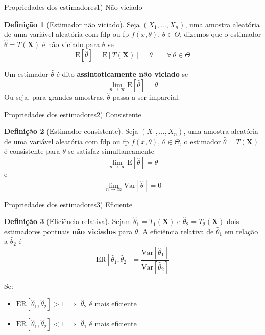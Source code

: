 \documentclass[10pt]{beamer}\usepackage[]{graphicx}\usepackage[]{color}
\newcommand{\mb}[1]{\mathbf{#1}}
\providecommand{\E}{\text{E}}
\providecommand{\Var}{\text{Var}}
\theoremstyle{definition}
\newtheorem*{mydef}{Definição}
\begin{document}
\begin{frame}[fragile]{Propriedades dos estimadores}{1) Não viciado}
  \begin{mydef}[Estimador não viciado]
    Seja $(X_1, \ldots, X_n)$, uma amostra aleatória de uma variável
    aleatória com fdp ou fp $f(x,\theta)$, $\theta \in \Theta$, dizemos
    que o estimador $\hat{\theta} = T(\mb{X})$ é não viciado para
    $\theta$ se
    \begin{equation*}
      \E[\hat{\theta}] = \E[T(\mb{X})] = \theta \qquad \forall \, \theta
      \in \Theta
    \end{equation*}
  \end{mydef}
  Um estimador $\hat\theta$ é dito \textbf{assintoticamente não viciado}
  se
  \begin{equation*}
    \lim_{n \to \infty} \E[\hat{\theta}] = \theta
  \end{equation*}
  Ou seja, para grandes amostras, $\hat\theta$ passa a ser imparcial.
\end{frame}

\begin{frame}[fragile]{Propriedades dos estimadores}{2) Consistente}
  \begin{mydef}[Estimador consistente]
    Seja $(X_1, \ldots, X_n)$, uma amostra aleatória de uma variável
    aleatória com fdp ou fp $f(x,\theta)$, $\theta \in \Theta$, o
    estimador $\hat{\theta} = T(\mb{X})$ é consistente para $\theta$ se
    satisfaz simultaneamente
    \begin{equation*}
      \lim_{n \to \infty} \E[\hat{\theta}] = \theta
    \end{equation*}
    e
    \begin{equation*}
      \lim_{n \to \infty} \Var[\hat{\theta}] = 0
    \end{equation*}
  \end{mydef}
\end{frame}

\begin{frame}[fragile]{Propriedades dos estimadores}{3) Eficiente}
  \begin{mydef}[Eficiência relativa]
    Sejam $\hat{\theta}_1 = T_1(\mb{X})$ e $\hat{\theta}_2 =
    T_2(\mb{X})$ dois estimadores pontuais \textbf{não viciados} para
    $\theta$. A eficiência relativa de $\hat{\theta}_1$ em relação a
    $\hat{\theta}_2$ é
    \begin{equation*}
      \text{ER}[\hat{\theta}_1, \hat{\theta}_2] = \frac{\Var[\hat{\theta}_1]}{\Var[\hat{\theta}_2]}
    \end{equation*}
  \end{mydef}
  \vspace{1em}
  Se:
  \begin{itemize}
  \item $\text{ER}[\hat{\theta}_1, \hat{\theta}_2] > 1$ $\Rightarrow$
  $\hat\theta_2$ é mais eficiente
  \item $\text{ER}[\hat{\theta}_1, \hat{\theta}_2] < 1$ $\Rightarrow$
  $\hat\theta_1$ é mais eficiente
  \end{itemize}
\end{frame}
\end{document}
